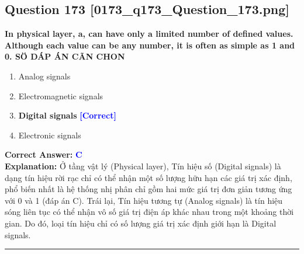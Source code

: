 \documentclass[11pt,a4paper]{article}
\begin{document}
\begin{minipage}{\textwidth}
\subsection*{Question 173 \quad \footnotesize{[0173\_q173\_Question\_173.png]}}
\noindent \textbf{In physical layer, a, can have only a limited number of defined values. Although each value can be any number, it is often as simple as 1 and 0. SÖ DÁP ÁN CÃN CHON}

\begin{enumerate}[label=\Alph*.]
    \item Analog signals
    \item Electromagnetic signals
    \item \textbf{Digital signals} \hfill \textcolor{blue}{\textbf{[Correct]}}
    \item Electronic signals
\end{enumerate}

\noindent \textbf{Correct Answer:} \textcolor{blue}{\textbf{C}} \\[2pt]
\noindent \textbf{Explanation:} Ở tầng vật lý (Physical layer), Tín hiệu số (Digital signals) là dạng tín hiệu rời rạc chỉ có thể nhận một số lượng hữu hạn các giá trị xác định, phổ biến nhất là hệ thống nhị phân chỉ gồm hai mức giá trị đơn giản tương ứng với 0 và 1 (đáp án C). Trái lại, Tín hiệu tương tự (Analog signals) là tín hiệu sóng liên tục có thể nhận vô số giá trị điện áp khác nhau trong một khoảng thời gian. Do đó, loại tín hiệu chỉ có số lượng giá trị xác định giới hạn là Digital signals.

\par\vspace{0.3cm}
\hrule
\vspace{0.3cm}
\end{minipage}
\end{document}
